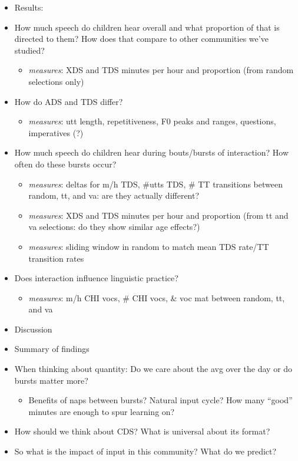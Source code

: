 \documentclass[man]{apa6}
\providecommand{\tightlist}{%
  \setlength{\itemsep}{0pt}\setlength{\parskip}{0pt}}
\theoremstyle{definition}
\theoremstyle{definition}
\theoremstyle{definition}
\theoremstyle{remark}
\begin{document}
\begin{itemize}
\tightlist
\item
  Results:
\item
  How much speech do children hear overall and what proportion of that
  is directed to them? How does that compare to other communities we've
  studied?

  \begin{itemize}
  \tightlist
  \item
    \emph{measures}: XDS and TDS minutes per hour and proportion (from
    random selections only)
  \end{itemize}
\item
  How do ADS and TDS differ?

  \begin{itemize}
  \tightlist
  \item
    \emph{measures}: utt length, repetitiveness, F0 peaks and ranges,
    questions, imperatives (?)
  \end{itemize}
\item
  How much speech do children hear during bouts/bursts of interaction?
  How often do these bursts occur?

  \begin{itemize}
  \tightlist
  \item
    \emph{measures}: deltas for m/h TDS, \#utts TDS, \# TT transitions
    between random, tt, and va: are they actually different?
  \item
    \emph{measures}: XDS and TDS minutes per hour and proportion (from
    tt and va selections: do they show similar age effects?)
  \item
    \emph{measures}: sliding window in random to match mean TDS rate/TT
    transition rates
  \end{itemize}
\item
  Does interaction influence linguistic practice?

  \begin{itemize}
  \tightlist
  \item
    \emph{measures}: m/h CHI vocs, \# CHI vocs, \& voc mat between
    random, tt, and va
  \end{itemize}
\item
  Discussion
\item
  Summary of findings
\item
  When thinking about quantity: Do we care about the avg over the day or
  do bursts matter more?

  \begin{itemize}
  \tightlist
  \item
    Benefits of naps between bursts? Natural input cycle? How many
    \enquote{good} minutes are enough to spur learning on?
  \end{itemize}
\item
  How should we think about CDS? What is universal about its format?
\item
  So what is the impact of input in this community? What do we predict?


\end{itemize}
\end{document}
